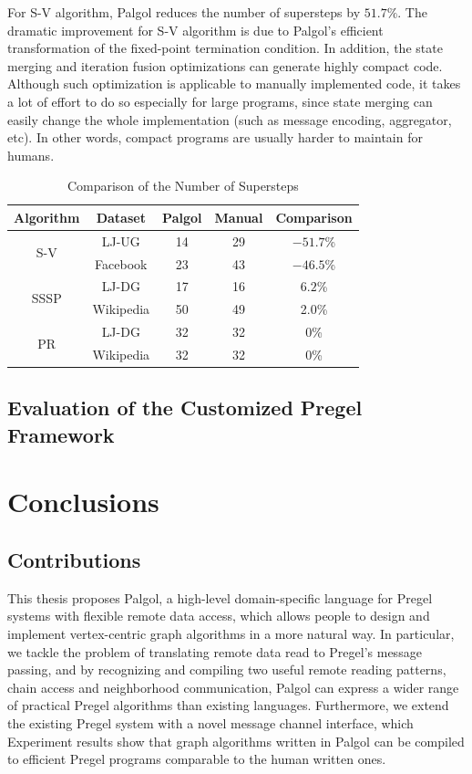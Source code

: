 \documentclass{sokendai_thesis} %
\begin{document}
For S-V algorithm, Palgol reduces the number of supersteps by $51.7\%$.
The dramatic improvement for S-V algorithm is due to Palgol's efficient transformation of the fixed-point termination condition.
In addition, the state merging and iteration fusion optimizations can generate highly compact code.
Although such optimization is applicable to manually implemented code, it takes a lot of effort to do so especially for large programs, since state merging can easily change the whole implementation (such as message encoding, aggregator, etc).
In other words, compact programs are usually harder to maintain for humans.

\begin{table}[t]
 \centering
 \caption{Comparison of the Number of Supersteps}
 \label{tab:steps}
 \begin{tabular}{c|c|c|c|c}
  \hline
  \textbf{Algorithm} & \textbf{Dataset} & Palgol & Manual & Comparison \\
  \hline\hline
  \multirow{2}{*}{S-V} & LJ-UG & 14 & 29 & $-51.7$\% \\
  \cline{2-5}
  & Facebook & 23 & 43 & $-46.5$\% \\
  \hline
  \multirow{2}{*}{SSSP} & LJ-DG & 17 & 16 & $6.2$\% \\
  \cline{2-5}
  & Wikipedia & 50 & 49 & 2.0\% \\
  \hline
  \multirow{2}{*}{PR} & LJ-DG & 32 & 32 & $0$\% \\
  \cline{2-5}
  & Wikipedia & 32 & 32 & $0$\% \\
  \hline
 \end{tabular}
\vspace{-2ex}\end{table}

\section{Evaluation of the Customized Pregel Framework}

\chapter{Conclusions}
\label{sec:conclusions}

\section{Contributions}

This thesis proposes Palgol, a high-level domain-specific language for Pregel systems with flexible remote data access, which allows people to design and implement vertex-centric graph algorithms in a more natural way.
In particular, we tackle the problem of translating remote data read to Pregel's message passing, and by recognizing and compiling two useful remote reading patterns, chain access and neighborhood communication, Palgol can express a wider range of practical Pregel algorithms than existing languages.
Furthermore, we extend the existing Pregel system with a novel message channel interface, which
Experiment results show that graph algorithms written in Palgol can be compiled to efficient Pregel programs comparable to the human written ones.
\end{document}
